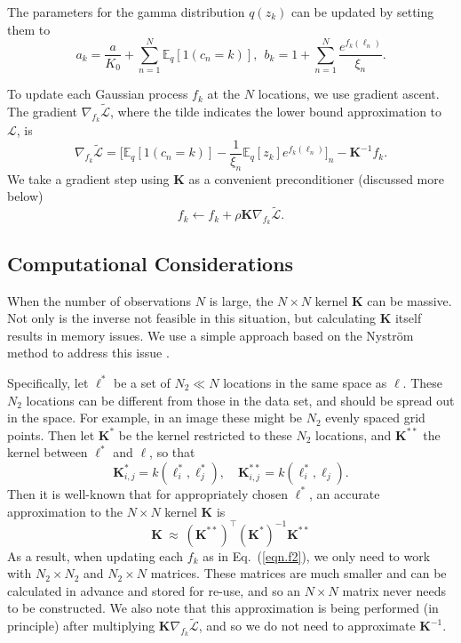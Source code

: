 \documentclass[runningheads,a4paper]{iscide}
\newcommand{\bs}[1]{\boldsymbol{#1}}
\begin{document}
The parameters for the gamma distribution $q(z_k)$ can be updated by setting them to
\begin{equation}
a_k = \frac{a}{K_0} +\sum_{n=1}^N \mathbb{E}_q [1(c_n=k)], ~~
b_k = 1 + \sum_{n=1}^N\frac{e^{f_k(\ell_n)}}{\xi_n}.\label{eqnqz}
\end{equation}

To update each Gaussian process $f_k$ at the $N$ locations, we use gradient ascent. The gradient $\nabla_{{f}_k}\mathcal{\widetilde{L}}$, where the tilde indicates the lower bound approximation to $\mathcal{L}$, is
\begin{equation}\label{eqn.f}
\nabla_{{f}_k}
\widetilde{\mathcal{L}}=\Big[\mathbb{E}_q[1(c_n=k)]-\frac{1}{\xi_n}\mathbb{E}_q
[z_k]e^{f_k(\ell_n)} \Big]_n - \mathbf{K}^{-1}{f}_k .
\end{equation}
We take a gradient step using $\mathbf{K}$ as a convenient preconditioner (discussed more below)
\begin{equation}\label{eqn.f2}
 {f}_k \leftarrow {f}_k + \rho \mathbf{K} \nabla_{{f}_k}\widetilde{\mathcal{L}}.
\end{equation}

\subsection{Computational Considerations} When the number of observations $N$ is large, the $N\times N$ kernel $\mathbf{K}$ can be massive. Not only is the inverse not feasible in this situation, but calculating $\mathbf{K}$ itself results in memory issues. We use a simple approach based on the Nystr\"{o}m method to address this issue \cite{Williams01nys,Kumar12SM}.

Specifically, let $\bs{\ell}^*$ be a set of $N_2 \ll N$ locations in the same space as $\bs{\ell}$. These $N_2$ locations can be different from those in the data set, and should be spread out in the space. For example, in an image these might be $N_2$ evenly spaced grid points. Then let $\mathbf{K}^*$ be the kernel restricted to these $N_2$ locations, and $\mathbf{K}^{**}$ the kernel between $\bs{\ell}^*$ and $\bs{\ell}$, so that $$\mathbf{K}^*_{i,j} = k(\ell_i^*,\ell_j^*),\quad \mathbf{K}^{**}_{i,j} = k(\ell_i^*,\ell_j).$$ Then it is well-known that for appropriately chosen $\bs{\ell}^*$, an accurate approximation to the $N\times N$ kernel $\textbf{K}$ is
\begin{equation}\label{eqn.Kapprox}
 \textbf{K} ~\approx ~ (\textbf{K}^{**})^\top (\textbf{K}^*)^{-1}\textbf{K}^{**}
\end{equation}
As a result, when updating each ${f}_k$ as in Eq.\ (\ref{eqn.f2}), we only need to work with $N_2\times N_2$ and $N_2\times N$ matrices. These matrices are much smaller and can be calculated in advance and stored for re-use, and so an $N\times N$ matrix never needs to be constructed. We also note that this approximation is being performed (in principle) after multiplying $\mathbf{K} \nabla_{{f}_k}\widetilde{\mathcal{L}}$, and so we do not need to approximate $\mathbf{K}^{-1}$.
\end{document}
